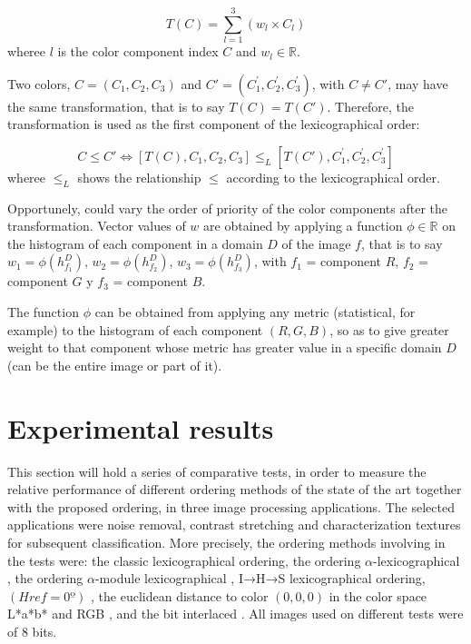 \begin{equation}
\label{Transformacion}
T(C)= \sum_{l=1}^3(w_l \times C_l)
\end{equation}  
wheree $l$ is the color component index $C$ and $w_l \in \mathbb{R}$. 

Two colors, $C=(C_1,C_2,C_3)$ and $C'=(C_1^{'},C_2^{'},C_3^{'})$, with $C\neq C'$, may have the same transformation, that is to say $T(C) = T(C')$.  Therefore, the transformation is used as the first component of the lexicographical order:

\begin{equation}
\label{Mio} 
 C\leq C'\Leftrightarrow [T(C),C_1,C_2,C_3] \leq_L [T(C'),C_1^{'},C_2^{'},C_3^{'}]
\end{equation} wheree $\leq_L$ shows the relationship $\leq$ according to the lexicographical order.	

Opportunely, could vary the order of priority of the color components after the transformation.
Vector values of $w$ are obtained by applying a function $\phi \in \mathbb{R}$ on the histogram of each component in a domain $D$ of the image $f$, that is to say $w_1 = \phi(h_{f_1}^D)$, $w_2 = \phi(h_{f_2}^D)$, $w_3 = \phi(h_{f_3}^D)$, with $f_1$ = component $R$, $f_2$ = component $G$ y $f_3$ =  component $B$.

The function $\phi$ can be obtained from applying any metric (statistical, for example) to the histogram of each component $(R,G,B)$, so as to give greater weight to that component whose metric has greater value in a specific domain $D$ (can be the entire image or part of it). 

 \section{Experimental results}

This section will hold a series of comparative tests, in order to measure the relative performance of different ordering methods of the state of the art together with the proposed ordering, in three image processing applications. The selected applications were noise removal, contrast stretching and characterization textures for subsequent classification.
More precisely, the ordering methods involving in the tests were:
the classic lexicographical ordering, the ordering $\alpha$-lexicographical \cite{zamora2001comparative}, the ordering $\alpha$-module lexicographical \cite{angulo2003morphological}, I→H→S lexicographical ordering, $(Href=0º)$ \cite{ortiz2004gaussian}, the euclidean distance to color $(0,0,0)$ in the color space L*a*b* and RGB \cite{ortiz2002procesamiento}, 
and the bit interlaced \cite{chanussot1997bit}. 
All images used on different tests were of $8$ bits. 

